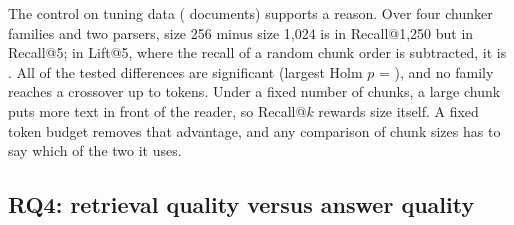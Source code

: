 The control on tuning data (\RQthreeSweepDocuments{} documents) supports a reason.
Over four chunker families and two parsers, size 256 minus size 1,024 is
\RQthreeSweepBudget{} in Recall@1,250 but \RQthreeSweepRecall{} in Recall@5; in
Lift@5, where the recall of a random chunk order is subtracted, it is
\RQthreeSweepLift{}. All \RQthreeSweepSignificant{} of the \RQthreeSweepTests{}
tested differences are significant (largest Holm $p$ =
\RQthreeSweepMaxHolm{}), and no family reaches a crossover up to
\FixedKBudget{} tokens. Under a fixed number of chunks, a large chunk puts more
text in front of the reader, so Recall@$k$ rewards size itself. A fixed token
budget removes that advantage, and any comparison of chunk sizes has to say
which of the two it uses.

\subsection{RQ4: retrieval quality versus answer quality}\label{sec:rq4}



